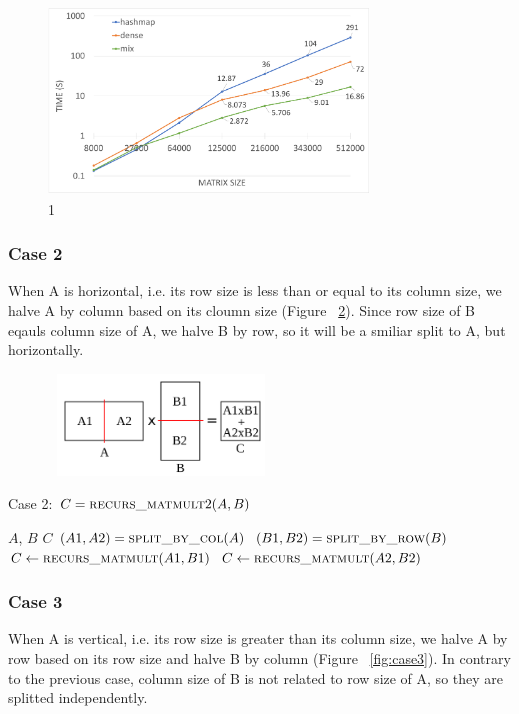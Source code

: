 \begin{figure}[tbh]
 \centering
 \includegraphics[width=8.5cm,height=5cm]{./figures/mix.pdf}
 \caption{1}
 \label{fig:mix}
\end{figure}


\subsubsection{Case 2}
\label{sec:case2}
When A is horizontal, i.e. its row size is less than or equal to its column size, we halve A by column based on its cloumn size (Figure ~\ref{fig:case2}). Since row size of B eqauls column size of A, we halve B by row, so it will be a smiliar split to A, but horizontally. 

\begin{figure}[tbh]
 \centering
 \includegraphics[width=6cm,height=2.7cm]{./figures/case2_001.pdf}
 \caption{}
 \label{fig:case2}
\end{figure}

\begin{algorithm}[H] 
  \caption{Case 2: $C = \textsc{recurs\_matmult}2(A, B)$} \label{alg:case2} 
  \begin{algorithmic}[1]
    \Require $A$, $B$
    \Ensure  $C$
    \State $(A1, A2) = \textsc{split\_by\_col}(A)$
    \State $(B1, B2) = \textsc{split\_by\_row}(B)$
    \State $C \leftarrow \textsc{recurs\_matmult}(A1,B1)$
    \State $C \leftarrow \textsc{recurs\_matmult}(A2,B2)$
  \end{algorithmic}
\end{algorithm}

\subsubsection{Case 3}
\label{sec:case3}
When A is vertical, i.e. its row size is greater than its column size, we halve A by row based on its row size and halve B by column (Figure ~\ref{fig:case3}). In contrary to the previous case, column size of B is not related to row size of A, so they are splitted independently.

